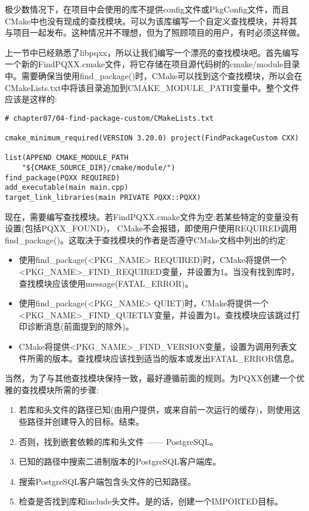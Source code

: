 极少数情况下，在项目中会使用的库不提供config文件或PkgConfig文件，而且CMake中也没有现成的查找模块。可以为该库编写一个自定义查找模块，并将其与项目一起发布。这种情况并不理想，但为了照顾项目的用户，有时必须这样做。

上一节中已经熟悉了libpqxx，所以让我们编写一个漂亮的查找模块吧。首先编写一个新的FindPQXX.cmake文件，将它存储在项目源代码树的cmake/module目录中。需要确保当使用find\_package()时，CMake可以找到这个查找模块，所以会在CMakeLists.txt中将该目录追加到CMAKE\_MODULE\_PATH变量中。整个文件应该是这样的:

\begin{lstlisting}[style=styleCMake]
# chapter07/04-find-package-custom/CMakeLists.txt

cmake_minimum_required(VERSION 3.20.0) project(FindPackageCustom CXX) 

list(APPEND CMAKE_MODULE_PATH 
	"${CMAKE_SOURCE_DIR}/cmake/module/")
find_package(PQXX REQUIRED)
add_executable(main main.cpp)
target_link_libraries(main PRIVATE PQXX::PQXX)
\end{lstlisting}

现在，需要编写查找模块。若FindPQXX.cmake文件为空:若某些特定的变量没有设置(包括PQXX\_FOUND)， CMake不会报错，即使用户使用REQUIRED调用find\_package()。这取决于查找模块的作者是否遵守CMake文档中列出的约定:

\begin{itemize}
\item 
使用find\_package(<PKG\_NAME> REQUIRED)时，CMake将提供一个<PKG\_NAME>\_FIND\_REQUIRED变量，并设置为1。当没有找到库时，查找模块应该使用message(FATAL\_ERROR)。

\item 
使用find\_package(<PKG\_NAME> QUIET)时，CMake将提供一个<PKG\_NAME>\_FIND\_QUIETLY变量，并设置为1。查找模块应该跳过打印诊断消息(前面提到的除外)。

\item 
CMake将提供<PKG\_NAME>\_FIND\_VERSION变量，设置为调用列表文件所需的版本。查找模块应该找到适当的版本或发出FATAL\_ERROR信息。
\end{itemize}

当然，为了与其他查找模块保持一致，最好遵循前面的规则。为PQXX创建一个优雅的查找模块所需的步骤:

\begin{enumerate}
\item 
若库和头文件的路径已知(由用户提供，或来自前一次运行的缓存)，则使用这些路径并创建导入的目标。结束。

\item 
否则，找到嵌套依赖的库和头文件 —— PostgreSQL。

\item 
已知的路径中搜索二进制版本的PostgreSQL客户端库。

\item 
搜索PostgreSQL客户端包含头文件的已知路径。

\item 
检查是否找到库和include头文件。是的话，创建一个IMPORTED目标。
\end{enumerate}

